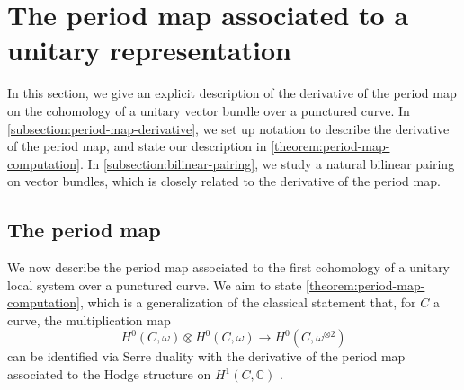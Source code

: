 \documentclass[12 pt]{amsart}
\theoremstyle{plain}
\theoremstyle{definition}
\theoremstyle{remark}
\numberwithin{equation}{section}
\begin{document}
\section{The period map associated to a unitary representation}
\label{section:unitary-period-map}

In this section, we give an explicit description of the derivative of the period map
on the cohomology of a unitary vector bundle over a punctured curve.
In \autoref{subsection:period-map-derivative},
we set up notation to describe the derivative of the period map,
and state our description in
\autoref{theorem:period-map-computation}.
In \autoref{subsection:bilinear-pairing},
we study a natural bilinear pairing on vector bundles,
which is closely related to the derivative of the period map.

\subsection{The period map}
	\label{subsection:period-map-derivative}
	We now describe the period map associated to the 
first cohomology of a unitary local system over a punctured curve.
We aim to state \autoref{theorem:period-map-computation}, which is a
generalization of the classical statement that, for $C$ a curve, the multiplication map
$$H^0(C, \omega) \otimes H^0(C, \omega) \to H^0(C, \omega^{\otimes 2})$$ can be
identified via Serre duality with the derivative of the period map associated to the Hodge structure on
$H^1(C, \mathbb C)$ \cite[Lemma 10.22]{Voisin:hodgeTheory}.
\end{document}
